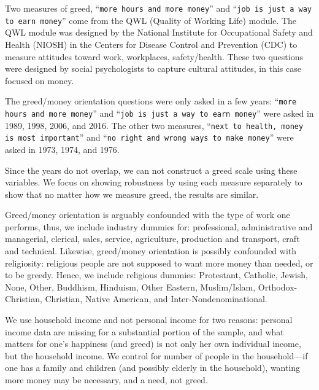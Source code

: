 \documentclass[10pt, letterpaper]{article}
\begin{document}
\begin{spacing}{1.8}
Two measures of greed, ``\texttt{more hours and more money}'' and  ``\texttt{job is just a way to earn money}'' come from the QWL (Quality of Working Life) module. The QWL module was designed by the National Institute for Occupational Safety and Health (NIOSH) in the Centers for Disease Control and Prevention (CDC) to measure attitudes toward work, workplaces,
safety/health. These two questions  were designed by social psychologists to capture cultural attitudes, in this case focused on money. 

The greed/money orientation questions were only asked in a few years:
``\texttt{more hours and more money}'' and ``\texttt{job is just a way to earn money}''
were asked in 1989, 1998, 2006, and 2016. The other two measures, ``\texttt{next
  to  health, money is most  important}'' and ``\texttt{no right and wrong  ways to
  make money}'' were asked in 1973, 1974, and 1976.

Since the years do not overlap, we can not construct a greed scale using these variables. We focus on
showing robustness by using each measure separately to show that no matter how we measure greed, the results are similar. 
%

Greed/money orientation is arguably confounded with the type of work one performs, thus, we include industry dummies for: professional, administrative and managerial, clerical, sales, service, agriculture, production and transport, craft and technical.           
%
Likewise, greed/money orientation is possibly confounded with religiosity:
religious people are not supposed to want more money than needed, or to be
greedy. Hence, we include religious dummies: Protestant, Catholic, Jewish, None,
Other, Buddhism, Hinduism, Other Eastern, Muslim/Islam, Orthodox-Christian,
Christian, Native American, and Inter-Nondenominational.

We use household income and not personal income for two reasons: personal income data are missing for a substantial portion of the sample, and  what matters for one's happiness (and greed) is not only her own individual income, but the household income.
%
We control for number of people in the household---if one has a family and
children (and possibly elderly in the household), wanting more money may be
necessary, and a need, not greed.


\end{spacing}
\end{document}
